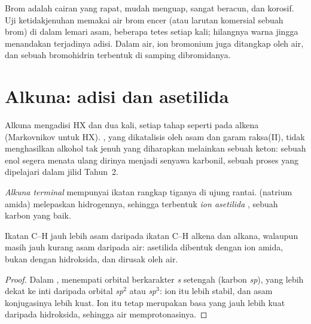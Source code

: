 \begin{inthelab}
Brom adalah cairan yang rapat, mudah menguap, sangat beracun, dan
korosif. Uji ketidakjenuhan memakai air brom encer (atau larutan komersial
sebuah  brom) di dalam lemari asam, beberapa tetes setiap kali;
hilangnya warna jingga menandakan terjadinya adisi. Dalam air, ion
bromonium juga ditangkap oleh air, dan sebuah bromohidrin terbentuk di
samping dibromidanya.
\end{inthelab}

\section{Alkuna: adisi dan asetilida}

Alkuna mengadisi HX dan  dua kali, setiap tahap seperti pada alkena
(Markovnikov untuk HX). , yang dikatalisis oleh asam dan garam
raksa(II), tidak menghasilkan alkohol tak jenuh yang diharapkan melainkan
sebuah keton: sebuah enol segera menata ulang dirinya menjadi senyawa
karbonil, sebuah proses yang dipelajari dalam jilid Tahun~2.

\begin{definition}\label{def:b1:electrophilic-additions:acetylide}
\emph{Alkuna terminal}  mempunyai
ikatan rangkap tiganya di ujung rantai.  (natrium amida)
melepaskan hidrogennya, sehingga terbentuk \emph{ion asetilida}
, sebuah  karbon yang baik.
\end{definition}

\begin{proposition}\label{prop:b1:electrophilic-additions:acetylide-acidity}
Ikatan C--H  jauh lebih asam daripada ikatan C--H alkena
dan alkana, walaupun masih jauh kurang asam daripada air: asetilida
dibentuk dengan ion amida, bukan dengan hidroksida, dan dirusak oleh air.
\end{proposition}

\begin{proof}
Dalam ,  menempati orbital
berkarakter \textit{s} setengah (karbon \textit{sp}), yang lebih dekat ke
inti daripada orbital  \textit{sp}$^2$ atau \textit{sp}$^3$:
ion itu lebih stabil, dan asam konjugasinya lebih kuat. Ion itu tetap
merupakan basa yang jauh lebih kuat daripada hidroksida, sehingga air
memprotonasinya.
\end{proof}

